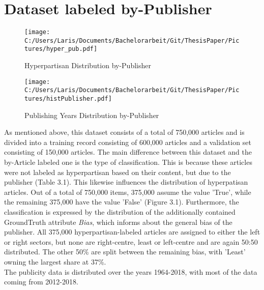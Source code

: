 \documentclass[a4paper, 11pt,titlepage,oneside,openany]{book}
\begin{document}
\section{Dataset labeled by-Publisher}
\begin{figure}[h]
	\begin{minipage}{.45\linewidth}
		\texttt{[image: C:/Users/Laris/Documents/Bachelorarbeit/Git/ThesisPaper/Pictures/hyper\_pub.pdf]}
		\caption{Hyperpartisan Distribution by-Publisher}
	\end{minipage}
	\hspace{.1\linewidth}%
	\begin{minipage}{.45\linewidth}
		\texttt{[image: C:/Users/Laris/Documents/Bachelorarbeit/Git/ThesisPaper/Pictures/histPublisher.pdf]}
		\caption{Publishing Years Distribution by-Publisher}
	\end{minipage}
\end{figure} 
\noindent As mentioned above, this dataset consists of a total of 750,000 articles and is divided into a training record consisting of 600,000 articles and a validation set consisting of 150,000 articles.
The main difference between this dataset and the by-Article labeled one is the type of classification. This is because these articles were not labeled as hyperpartisan based on their content, but due to the publisher (Table 3.1). This likewise influences the distribution of hyperpatisan articles.
 Out of a total of 750,000 items, 375,000 assume the value 'True', while the remaining 375,000 have the value 'False' (Figure 3.1). 
Furthermore, the classification is expressed by the distribution of the additionally contained GroundTruth attribute \textit{Bias}, which informs about the general bias of the publisher. All 375,000 hyperpartisan-labeled articles are assigned to either the left or right sectors, but none are right-centre, least or left-centre and are again 50:50 distributed. The other 50\% are split between the remaining bias, with 'Least' owning the largest share at 37\%.\\
The publicity data is distributed over the years 1964-2018, with most of the data coming from 2012-2018.
\end{document}
